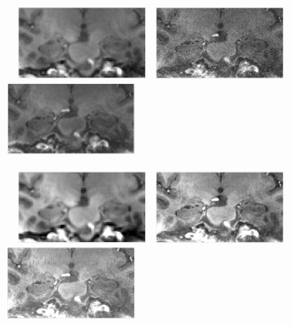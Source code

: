 \documentclass[]{article}
\begin{document}
\begin{figure}
	~
	{\includegraphics[width=0.33\textwidth]{noisy5025_200_x.pdf}}~
	{\includegraphics[width=0.33\textwidth]{noisy5025_400_x.pdf}}~
	{\includegraphics[width=0.33\textwidth]{noisy5025_600_x.pdf}}~\\
	\vspace{-1em}
	
	~
	{\includegraphics[width=0.33\textwidth]{denoised5025_200_x.pdf}}~
	{\includegraphics[width=0.33\textwidth]{denoised5025_400_x.pdf}}~
	{\includegraphics[width=0.33\textwidth]{denoised5025_600_x.pdf}}~\\
	\vspace{-1em}
	

\end{figure}
\end{document}
